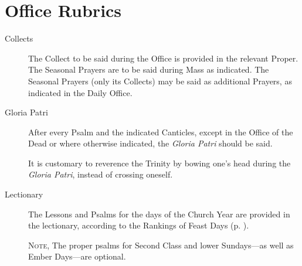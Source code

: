 \section{Office Rubrics}
\begin{description}
\item[Collects] The Collect to be said during the Office is provided in the relevant Proper. The Seasonal Prayers are to be said during Mass as indicated. The Seasonal Prayers (only its Collects) may be said as additional Prayers, as indicated in the Daily Office.
\item[Gloria Patri] After every Psalm and the indicated Canticles, except in the Office of the Dead or where otherwise indicated, the \emph{Gloria Patri} should be said.\par
It is customary to reverence the Trinity by bowing one's head during the \emph{Gloria Patri}, instead of crossing oneself.
\item[Lectionary] The Lessons and Psalms for the days of the Church Year are provided in the lectionary, according to the Rankings of Feast Days (p. \pageref{ranking}).\par
\textsc{Note,} The proper psalms for Second Class and lower Sundays---as well as Ember Days---are optional.


\end{description}
